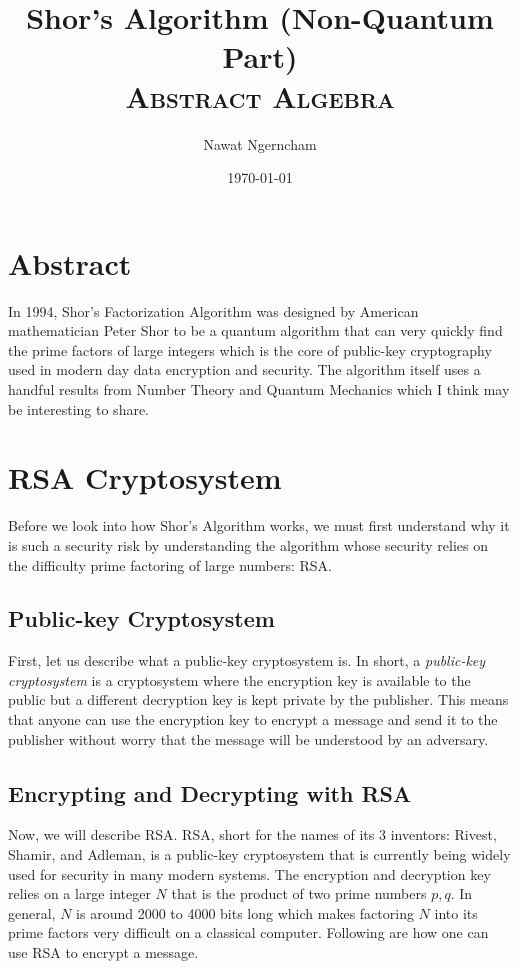 \documentclass{article}
\title{\Huge{Shor's Algorithm (Non-Quantum Part)}
	\\
	\Large\scshape{Abstract Algebra}}
\author{Nawat Ngerncham}
\date{\today}
\begin{document}
\maketitle

\section{Abstract}

In 1994, Shor's Factorization Algorithm was designed by American mathematician Peter Shor to be a quantum algorithm that can very quickly find the prime factors of large integers which is the core of public-key cryptography used in modern day data encryption and security. The algorithm itself uses a handful results from Number Theory and Quantum Mechanics which I think may be interesting to share.

\section{RSA Cryptosystem}

Before we look into how Shor's Algorithm works, we must first understand why it is such a security risk by understanding the algorithm whose security relies on the difficulty prime factoring of large numbers: RSA.

\subsection{Public-key Cryptosystem}

First, let us describe what a public-key cryptosystem is. In short, a \textit{public-key cryptosystem} is a cryptosystem where the encryption key is available to the public but a different decryption key is kept private by the publisher. This means that anyone can use the encryption key to encrypt a message and send it to the publisher without worry that the message will be understood by an adversary.

\subsection{Encrypting and Decrypting with RSA}

Now, we will describe RSA. RSA, short for the names of its 3 inventors: Rivest, Shamir, and Adleman, is a public-key cryptosystem that is currently being widely used for security in many modern systems. The encryption and decryption key relies on a large integer \(N\) that is the product of two prime numbers \(p, q\). In general, \(N\) is around 2000 to 4000 bits long which makes factoring \(N\) into its prime factors very difficult on a classical computer. Following are how one can use RSA to encrypt a message.
\end{document}
